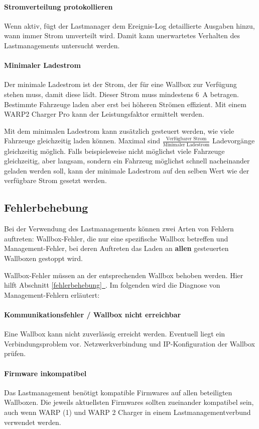 \documentclass[a4paper,10pt]{article}
\newcommand*{\fullref}[1]{\hyperref[{#1}]{\ref*{#1}~\nameref*{#1}}}
\begin{document}
\begin{multicols*}{2}
	\paragraph{Stromverteilung protokollieren}
	Wenn aktiv, fügt der Lastmanager dem Ereignis-Log detaillierte Ausgaben hinzu, wann immer Strom umverteilt wird. Damit kann unerwartetes Verhalten des
	Lastmanagements untersucht werden.

	\paragraph{Minimaler Ladestrom}
	Der minimale Ladestrom ist der Strom, der für eine Wallbox zur Verfügung stehen muss, damit diese lädt. Dieser Strom muss mindestens \SI{6}{\ampere} betragen.
	Bestimmte Fahrzeuge laden aber erst bei höheren Strömen effizient. Mit einem WARP2 Charger Pro kann der Leistungsfaktor ermittelt werden.

	Mit dem minimalen Ladestrom kann zusätzlich gesteuert werden, wie viele Fahrzeuge gleichzeitig laden können.
	Maximal sind $\frac{\text{Verfügbarer Strom}}{\text{Minimaler Ladestrom}}$ Ladevorgänge gleichzeitig möglich. Falls beispielsweise nicht möglichst viele
	Fahrzeuge gleichzeitig, aber langsam, sondern ein Fahrzeug möglichst schnell nacheinander geladen werden soll, kann der minimale Ladestrom auf den selben Wert
	wie der verfügbare Strom gesetzt werden.

	\subsection{Fehlerbehebung}
	Bei der Verwendung des Lastmanagements können zwei Arten von Fehlern auftreten: Wallbox-Fehler, die nur eine spezifische Wallbox betreffen und Management-Fehler,
	bei deren Auftreten das Laden an \textbf{allen} gesteuerten Wallboxen gestoppt wird.

	Wallbox-Fehler müssen an der entsprechenden Wallbox behoben werden. Hier hilft Abschnitt \fullref{fehlerbehebung}. Im folgenden wird die Diagnose von Management-Fehlern erläutert:

	\paragraph{Kommunikationsfehler / Wallbox nicht erreichbar}
	Eine Wallbox kann nicht zuverlässig erreicht werden. Eventuell liegt ein Verbindungsproblem vor. Netzwerkverbindung und IP-Konfiguration der Wallbox prüfen.

	\paragraph{Firmware inkompatibel}
	Das Lastmanagement benötigt kompatible Firmwares auf allen beteiligten Wallboxen. Die jeweils aktuellsten Firmwares sollten zueinander kompatibel sein,
	auch wenn WARP (1) und WARP 2 Charger in einem Lastmanagementverbund verwendet werden.


\end{multicols*}
\end{document}
